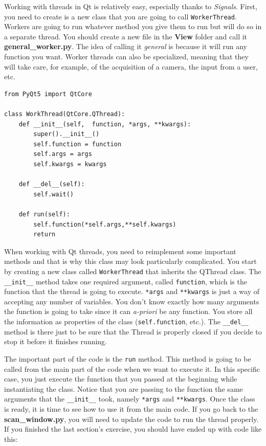 Working with threads in Qt is relatively easy, especially thanks to
\emph{Signals}. First, you need to create is a new class that you are
going to call \texttt{WorkerThread}. Workers are going to run whatever
method you give them to run but will do so in a separate thread. You
should create a new file in the \textbf{View} folder and call it
\textbf{general\_worker.py}. The idea of calling it \emph{general} is
because it will run any function you want. Worker threads can also be
specialized, meaning that they will take care, for example, of the
acquisition of a camera, the input from a user, etc.

\begin{verbatim}
from PyQt5 import QtCore

class WorkThread(QtCore.QThread):
    def __init__(self,  function, *args, **kwargs):
        super().__init__()
        self.function = function
        self.args = args
        self.kwargs = kwargs

    def __del__(self):
        self.wait()

    def run(self):
        self.function(*self.args,**self.kwargs)
        return
\end{verbatim}

When working with Qt threads, you need to reimplement some important
methods and that is why this class may look particularly complicated.
You start by creating a new class called \texttt{WorkerThread} that
inherits the QThread class. The \texttt{__init__} method takes one
required argument, called \texttt{function}, which is the function that
the thread is going to execute. \texttt{*args} and \texttt{**kwargs} is
just a way of accepting any number of variables. You don't know exactly
how many arguments the function is going to take since it can
\emph{a-priori} be any function. You store all the information as
properties of the class (\texttt{self.function}, etc.). The
\texttt{__del__} method is there just to be sure that the Thread is
properly closed if you decide to stop it before it finishes running.

The important part of the code is the \texttt{run} method. This method
is going to be called from the main part of the code when we want to
execute it. In this specific case, you just execute the function that
you passed at the beginning while instantiating the class. Notice that
you are passing to the function the same arguments that the
\texttt{__init__} took, namely \texttt{*args} and \texttt{**kwargs}.
Once the class is ready, it is time to see how to use it from the main
code. If you go back to the \textbf{scan\_window.py}, you will need to
update the code to run the thread properly. If you finished the last
section's exercise, you should have ended up with code like this:

